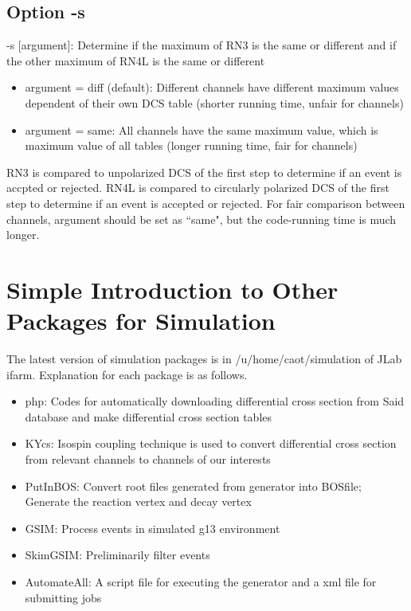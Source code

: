 \documentclass[a4paper]{article}
\begin{document}
\subsection{Option -s}
          -s [argument]: Determine if the maximum of RN3 is the same or different and if the other maximum of RN4L is the same or different
         \begin{itemize}
	 \item argument = diff (default): Different channels have different maximum values dependent of their own DCS table (shorter running time, unfair for channels)
	 \item argument = same: All channels have the same maximum value, which is maximum value of all tables (longer running time, fair for channels)
          \end{itemize}
RN3 is compared to unpolarized DCS of the first step to determine if an event is accpted or rejected. RN4L is compared to circularly polarized DCS of the first step to determine if an event is accepted or rejected. For fair comparison between channels, argument should be set as ``same", but the code-running time is much longer.

\section{Simple Introduction to Other Packages for Simulation}
The latest version of simulation packages is in /u/home/caot/simulation of JLab ifarm. Explanation for each package is as follows. 

\begin{itemize}
\item php: Codes for automatically downloading differential cross section from Said database and make differential cross section tables
\item KYcs: Isospin coupling technique is used to convert differential cross section from relevant channels to channels of our interests
\item PutInBOS: Convert root files generated from generator into BOSfile; Generate the reaction vertex and decay vertex
\item GSIM: Process events in simulated g13 environment
\item SkimGSIM: Preliminarily filter events
\item AutomateAll: A script file for executing the generator and a xml file for submitting jobs

\end{itemize}
\end{document}
